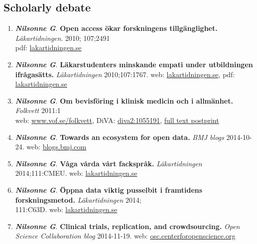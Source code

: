 \documentclass[10pt]{article}
\begin{document}
\subsection*{Scholarly debate}
\begin{enumerate}[nolistsep]
\item \textbf{\textit{Nilsonne G}}. \textbf{Open access ökar forskningens tillgänglighet.} \textit{Läkartidningen}. 2010; 107;2491\\
pdf: \href{http://www.lakartidningen.se/OldWebArticlePdf/1/15188/2491.pdf}{lakartidningen.se}
\item \textbf{\textit{Nilsonne G}}. \textbf{Läkarstudenters minskande empati under utbildningen ifrågasätts.} \emph{Läkartidningen} 2010;107:1767.
web: \href{http://ww2.lakartidningen.se/07engine.php?articleId=14714}{lakartidningen.se}, pdf: \href{http://ww2.lakartidningen.se/store/articlepdf/1/14714/1767\_1768.pdf}{lakartidningen.se}
\item \textbf{\textit{Nilsonne G}}. \textbf{Om bevisföring i klinisk medicin och i allmänhet.} \emph{Folkvett} 2011:1\\
web: \href{http://www.vof.se/folkvett/ar-2011/nr-1/om-bevisforing-klinisk-medicin-och-allmanhet/}{www.vof.se/folkvett}, DiVA: \href{http://www.diva-portal.org/smash/record.jsf?pid=diva2\%3A1055191\&dswid=-9257}{diva2:1055191}, \href{http://www.diva-portal.org/smash/get/diva2:1055191/FULLTEXT01.pdf}{full text postprint}
\item \textbf{\textit{Nilsonne G}}. \textbf{Towards an ecosystem for open data.} \emph{BMJ blogs} 2014-10-24.
web: \href{http://blogs.bmj.com/bmj/2014/10/24/gustav-nilsonne-towards-an-ecosystem-for-open-data/}{blogs.bmj.com}
\item \textbf{\textit{Nilsonne G}}. \textbf{Våga vårda vårt fackspråk.} \emph{Läkartidningen} 2014;111:CMEU.
web: \href{http://www.lakartidningen.se/Aktuellt/Kultur/Kultur/2014/02/Vaga-varda-vart-facksprak/}{lakartidningen.se}
\item \textbf{\textit{Nilsonne G}}. \textbf{Öppna data viktig pusselbit i framtidens forskningsmetod.} \emph{Läkartidningen} 2014;\\111:C63D.
web: \href{http://www.lakartidningen.se/Opinion/Debatt/2014/10/Oppna-data-viktig-pusselbit-i-framtidens-forskningsmetod/}{lakartidningen.se}
\item \textbf{\textit{Nilsonne G}}. \textbf{Clinical trials, replication, and crowdsourcing.} \emph{Open Science Collaboration blog} 2014-11-19.
web: \href{http://osc.centerforopenscience.org/2014/11/19/clinical-trials-replication-crowdsourcing/}{osc.centerforopenscience.org}

\end{enumerate}
\end{document}

